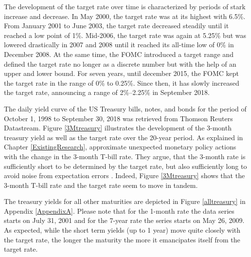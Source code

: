 \documentclass[11pt,a4paper,english,oneside]{book}
\numberwithin{equation}{chapter}
\begin{document}
The development of the target rate over time is characterized by periods of stark increase and decrease. In May 2000, the target rate was at its highest with 6.5\%. From January 2001 to June 2003, the target rate decreased steadily until it reached a low point of 1\%. Mid-2006, the target rate was again at 5.25\% but was lowered drastically in 2007 and 2008 until it reached its all-time low of 0\% in December 2008. At the same time, the FOMC introduced a target range and defined the target rate no longer as a discrete number but with the help of an upper and lower bound. For seven years, until december 2015, the FOMC kept the target rate in the range of 0\% to 0.25\%. Since then, it has slowly increased the target rate, announcing a range of 2\%--2.25\% in September 2018.
%

The daily yield curve of the US Treasury bills, notes, and bonds for the period of October 1, 1998 to September 30, 2018 was retrieved from Thomson Reuters Datastream. Figure \ref{3Mtreasury} illustrates the development of the 3-month treasury yield as well as the target rate over the 20-year period. As explained in Chapter \ref{ExistingResearch}, \citeauthor{Ellingsen.2003} approximate unexpected monetary policy actions with the change in the 3-month T-bill rate. They argue, that the 3-month rate is sufficiently short to be determined by the target rate, but also sufficiently long to avoid noise from expectation errors \citep[~p. 13]{Ellingsen.2003}. Indeed, Figure \ref{3Mtreasury} shows that the 3-month T-bill rate and the target rate seem to move in tandem.  

The treasury yields for all other maturities are depicted in Figure \ref{alltreasury} in Appendix \ref{AppendixA}. Please note that for the 1-month rate the data series starts on July 31, 2001 and for the 7-year rate the series starts on May 26, 2009. %
As expected, while the short term yields (up to 1 year) move quite closely with the target rate, the longer the maturity the more it emancipates itself from the target rate. 

\end{document}
